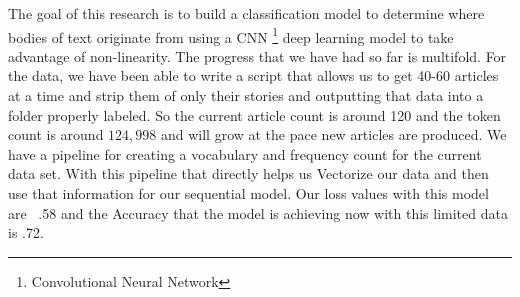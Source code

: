 The goal of this research is to build a classification model to determine where bodies of text originate from using a CNN \footnote{Convolutional Neural Network} deep learning model to take advantage of non-linearity. 
The progress that we have had so far is multifold. 
For the data, we have been able to write a script that allows us to get 40-60 articles at a time and strip them of only their stories and outputting that data into a folder properly labeled. 
So the current article count is around 120 and the token count is around $124,998$ and will grow at the pace new articles are produced. 
We have a pipeline for creating a vocabulary and frequency count for the current data set. With this pipeline that directly helps us Vectorize our data and then use that information for our sequential model.
Our loss values with this model are ~.58 and the Accuracy that the model is achieving now with this limited data is .72. 

